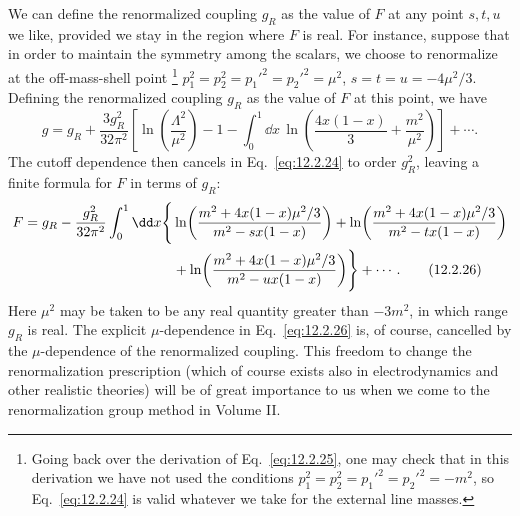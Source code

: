 We can define the renormalized coupling $g_R$ as the value of $F$ at any
point $s,t,u$ we like, provided we stay in the region where $F$ is real. For
instance, suppose that in order to maintain the symmetry among the scalars,
we choose to renormalize at the off-mass-shell point
\footnote{Going back over the derivation of Eq.~\eqref{eq:12.2.25}, one may
check that in this derivation we have not used the conditions
$p_1^2=p_2^2=p_1'^2=p_2'^2=-m^2$, so Eq.~\eqref{eq:12.2.24} is valid
whatever we take for the external line masses.}
$p_1^2=p_2^2=p_1'^2=p_2'^2=\mu^2$, $s=t=u=-4\mu^2/3$. Defining the
renormalized coupling $g_R$ as the value of $F$ at this point, we have
\begin{equation}
  g=g_R+\frac{3g_R^2}{32\pi^2}
  \left[\ln\!\left(\frac{\Lambda^2}{\mu^2}\right)-1
  -\int_0^1\dd x\,\ln\!\left(\frac{4x(1-x)}3+\frac{m^2}{\mu^2}\right)\right]
  +\cdots.
  \tag{12.2.25}\label{eq:12.2.25}
\end{equation}
The cutoff dependence then cancels in Eq.~\eqref{eq:12.2.24} to order
$g_R^2$, leaving a finite formula for $F$ in terms of $g_R$:
\begin{align}
 F=g_R-\frac{g_R^2}{32\pi^2}\int_0^1\dd x\Biggl\{
 &\ln\!\left(\frac{m^2+4x(1-x)\mu^2/3}{m^2-sx(1-x)}\right)
 +\ln\!\left(\frac{m^2+4x(1-x)\mu^2/3}{m^2-tx(1-x)}\right)
 \notag\\
 &+\ln\!\left(\frac{m^2+4x(1-x)\mu^2/3}{m^2-ux(1-x)}\right)
 \Biggr\}+\cdots.
 \tag{12.2.26}\label{eq:12.2.26}
\end{align}
Here $\mu^2$ may be taken to be any real quantity greater than $-3m^2$, in
which range $g_R$ is real. The explicit $\mu$-dependence in
Eq.~\eqref{eq:12.2.26} is, of course, cancelled by the $\mu$-dependence of
the renormalized coupling. This freedom to change the renormalization
prescription (which of course exists also in electrodynamics and other
realistic theories) will be of great importance to us when we come to the
renormalization group method in Volume II.
